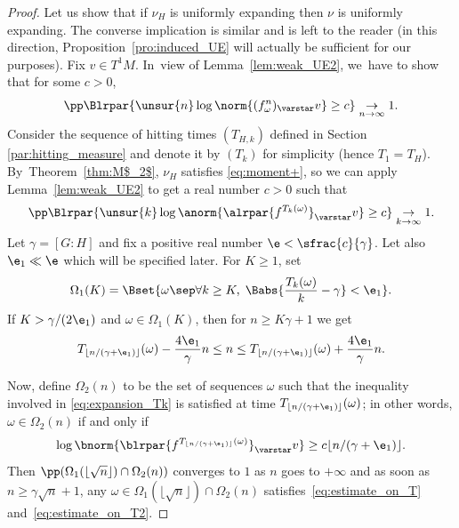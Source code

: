 \begin{proof}
Let us show that if $\nu_H$ is uniformly expanding then $\nu$ is uniformly expanding.
The converse implication is similar and is left to the reader (in
this direction, Proposition~\ref{pro:induced_UE} will actually be sufficient for our purposes).
Fix $ v\in T^1M$. In~view of Lemma~\ref{lem:weak_UE2}, we~have to show that for some $c>0$,
\begin{equation*}\label{eq:expansion_n}
\pp\Blrpar{ \unsur{n}\log \norm{ (f^n_\omega)_\varstar v} \geq c}
\underset{n\to\infty}{\to} 1.
\end{equation*}
Consider the sequence of hitting times $(T_{H,k})$ defined in Section \ref{par:hitting_measure} and
denote it by $(T_k)$
for simplicity (hence $T_1=T_H$). By~Theorem~\ref{thm:M$_2$},
$\nu_H$ satisfies \eqref{eq:moment+}, so we can apply
Lemma~\ref{lem:weak_UE2} to get a real number $c>0$ such that
\begin{equation}\label{eq:expansion_Tk}
\pp\Blrpar{ \unsur{k} \log\anorm{\alrpar{f^{T_{k}(\omega)}}_\varstar v} \geq c} \underset{k\to\infty}{\to} 1.
\end{equation}
Let $\gamma = [G:H]$ and fix a positive real number
$\e < \sfrac{c}{\gamma}$. Let also $\e_1\ll\e$ which will be specified later.
For $K\geq 1$, set
\begin{equation*}
\Omega_1(K)=\Bset{ \omega \sep  \forall k\geq K, \; \Babs{\frac{T_k(\omega)}{k} -\gamma} < \e_1 }.
\end{equation*}
If $K>\gamma/(2\e_1)$ and $\omega\in \Omega_1(K)$, then for $n\geq K\gamma+1$ we get
\begin{equation}\label{eq:estimate_on_T}
T_{\lfloor n/(\gamma+\e_1)\rfloor}(\omega)- \frac{4\e_1}{\gamma}n \leq n \leq T_{\lfloor n/(\gamma+\e_1)\rfloor}(\omega)+ \frac{4\e_1}{\gamma}n.
\end{equation}

Now, define $\Omega_2(n )$ to be the set of sequences $\omega$ such that
the inequality involved in \eqref{eq:expansion_Tk} is satisfied at time $T_{\lfloor n/(\gamma+\e_1)\rfloor}(\omega)$; in other words, $\omega\in \Omega_2(n)$ if and only if
\begin{equation}\label{eq:estimate_on_T2}
\log\bnorm{\blrpar{f^{T_{\lfloor n/(\gamma+\e_1)\rfloor}(\omega)}}_\varstar v} \geq c \lfloor n/(\gamma+\e_1)\rfloor.
\end{equation}
Then $\pp(\Omega_1(\lfloor\sqrt{n}\rfloor)\cap \Omega_2(n))$ converges to $1$ as $n$ goes to $+\infty$
and as soon as $n\geq \gamma\sqrt{n}+1$, any $\omega\in \Omega_1(\lfloor\sqrt{n}\rfloor)\cap \Omega_2(n)$
satisfies~\eqref{eq:estimate_on_T} and~\eqref{eq:estimate_on_T2}.


\end{proof}
